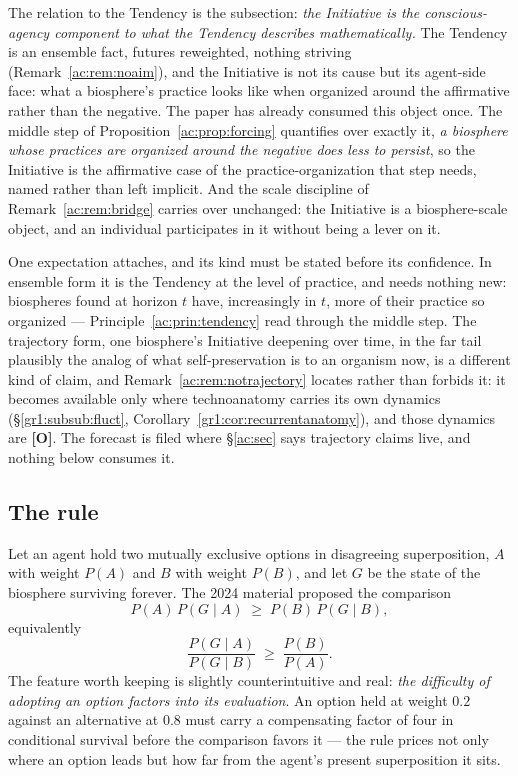 \documentclass[11pt]{article}
\numberwithin{equation}{section}
\theoremstyle{plain}
\theoremstyle{definition}
\theoremstyle{remark}
\begin{document}
The relation to the Tendency is the subsection: \emph{the Initiative is the conscious-agency component to what the Tendency describes mathematically.} The Tendency is an ensemble fact, futures reweighted, nothing striving (Remark~\ref{ac:rem:noaim}), and the Initiative is not its cause but its agent-side face: what a biosphere's practice looks like when organized around the affirmative rather than the negative. The paper has already consumed this object once. The middle step of Proposition~\ref{ac:prop:forcing} quantifies over exactly it, \emph{a biosphere whose practices are organized around the negative does less to persist}, so the Initiative is the affirmative case of the practice-organization that step needs, named rather than left implicit. And the scale discipline of Remark~\ref{ac:rem:bridge} carries over unchanged: the Initiative is a biosphere-scale object, and an individual participates in it without being a lever on it.

One expectation attaches, and its kind must be stated before its confidence. In ensemble form it is the Tendency at the level of practice, and needs nothing new: biospheres found at horizon $t$ have, increasingly in $t$, more of their practice so organized --- Principle~\ref{ac:prin:tendency} read through the middle step. The trajectory form, one biosphere's Initiative deepening over time, in the far tail plausibly the analog of what self-preservation is to an organism now, is a different kind of claim, and Remark~\ref{ac:rem:notrajectory} locates rather than forbids it: it becomes available only where technoanatomy carries its own dynamics (\S\ref{gr1:subsub:fluct}, Corollary~\ref{gr1:cor:recurrentanatomy}), and those dynamics are \textbf{[O]}. The forecast is filed where \S\ref{ac:sec} says trajectory claims live, and nothing below consumes it.

\subsection{The rule}\label{gs:sub:rule}

Let an agent hold two mutually exclusive options in disagreeing superposition, $A$ with weight $P(A)$ and $B$ with weight $P(B)$, and let $G$ be the state of the biosphere surviving forever. The 2024 material proposed the comparison
\begin{equation}\label{gs:eq:rule}
    P(A)\,P(G \mid A) \;\ge\; P(B)\,P(G \mid B),
\end{equation}
equivalently
\begin{equation}\label{gs:eq:ratio}
    \frac{P(G \mid A)}{P(G \mid B)} \;\ge\; \frac{P(B)}{P(A)}.
\end{equation}
The feature worth keeping is slightly counterintuitive and real: \emph{the difficulty of adopting an option factors into its evaluation}. An option held at weight $0.2$ against an alternative at $0.8$ must carry a compensating factor of four in conditional survival before the comparison favors it --- the rule prices not only where an option leads but how far from the agent's present superposition it sits.
\end{document}
